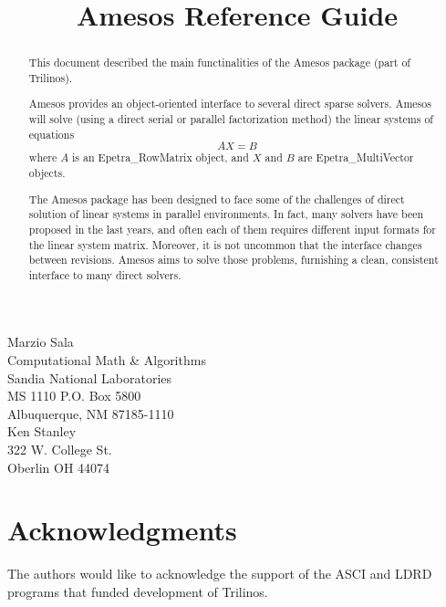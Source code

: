 \documentclass[11pt]{SANDreport}
\title{Amesos Reference Guide}
\begin{document}
\maketitle

\begin{center}
Marzio  Sala \\
Computational Math \& Algorithms \\
Sandia National Laboratories\\
MS 1110 P.O. Box 5800 \\
Albuquerque, NM 87185-1110\\[30pt]
Ken Stanley\\
322 W. College St.\\
Oberlin OH 44074
\end{center}

\vspace{20pt}

\begin{abstract}
  
  This document described the main functinalities of the Amesos package
  (part of Trilinos).
  
  Amesos provides an object-oriented interface to several direct sparse
  solvers. Amesos will solve (using a direct serial or parallel
  factorization method) the linear systems of equations
  \begin{equation}
    \label{eq:linear_system}
    A X = B
  \end{equation}
  where $A$ is an Epetra\_RowMatrix object, and $X$ and $B$ are
  Epetra\_MultiVector objects.
  
  The Amesos package has been designed to face some of the challenges of
  direct solution of linear systems in parallel environments. In fact,
  many solvers have been proposed in the last years, and often each of
  them requires different input formats for the linear system matrix.
  Moreover, it is not uncommon that the interface changes between
  revisions. Amesos aims to solve those problems, furnishing a clean,
  consistent interface to many direct solvers.
  
\end{abstract}

\clearpage

\SANDmain

\tableofcontents

\clearpage

\section*{Acknowledgments}
The authors would like to acknowledge the support of the ASCI and LDRD programs
that funded development of Trilinos.
\end{document}
